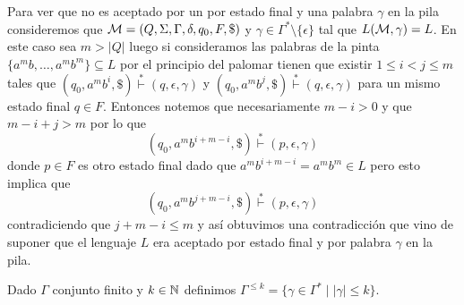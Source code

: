 \documentclass[tesis.tex]{subfiles}
\begin{document}
\begin{ej}
		
		
%		
%		
%		
		
		Para ver que no es aceptado por un \APD por estado final y una palabra $\gamma$ en la pila consideremos que ${\cal M} = (Q,\Sigma, \Gamma, \delta, q_0, F, \$)$ \APD y $\gamma \in \Gamma^{*} \setminus \{ \epsilon \}$ tal que $L({\cal M}, \gamma) = L$.
		En este caso sea $m > |Q|$ luego si consideramos las palabras de la pinta $\{ a^mb, \dots, a^mb^m  \} \subseteq L$ por el principio del palomar tienen que existir $1 \le i < j \le m$ tales que $(q_{0},a^mb^i, \$) \overset{*}{\vdash} (q,\epsilon,\gamma)$ y $(q_{0},a^mb^j, \$) \overset{*}{\vdash} (q,\epsilon,\gamma)$ para un mismo estado final $q \in F$.
		Entonces notemos que necesariamente $m - i > 0$ y que $m-i+j > m$ por lo que
		\[
			(q_{0},a^mb^{i+m-i}, \$) \overset{*}{\vdash} (p,\epsilon,\gamma)
		\]
		donde $p \in F$ es otro estado final dado que $a^mb^{i+m-i} = a^mb^m \in L$ pero esto implica que 
		\[
		(q_{0},a^mb^{j+m-i}, \$) \overset{*}{\vdash} (p,\epsilon,\gamma)
		\]
		contradiciendo que $j+m-i \le m$ y así obtuvimos una contradicción que vino de suponer que el lenguaje $L$ era aceptado por estado final y por palabra $\gamma$ en la pila.
\end{ej}

\bigskip		

Dado $\Gamma$ conjunto finito y $k \in \mathbb{N}$ 
definimos $\Gamma^{\le k} = \{ \gamma \in \Gamma^{*} \mid |\gamma| \le k \}$.
\end{document}
